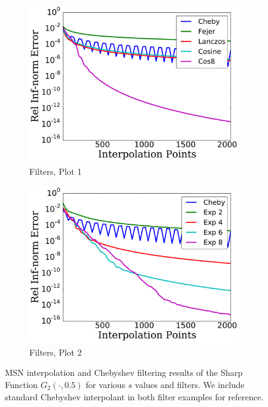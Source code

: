 \begin{figure}[p]
    \begin{subfigure}{0.45\textwidth}
    \includegraphics[width=\textwidth]{plots/cheby_interp_filter_rough_sharp_func_2.pdf}
    \caption{Filters, Plot 1}
    \end{subfigure}
    \begin{subfigure}{0.45\textwidth}
    \includegraphics[width=\textwidth]{plots/cheby_interp_filter_2_rough_sharp_func_2.pdf}
    \caption{Filters, Plot 2}
    \end{subfigure}
\caption[Rough Interpolation Comparison: Sharp Function 2]{
MSN interpolation and Chebyshev filtering results of the Sharp Function
$G_{2}(\cdot,0.5)$ for various $s$ values and filters.
We include standard Chebyshev interpolant in both filter examples for reference.
}
\label{fig:rough_comparison_sharp_func_2}
\end{figure}



